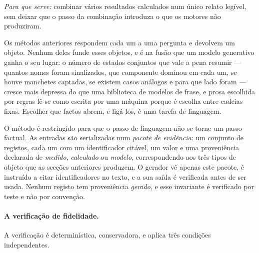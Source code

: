 \emph{Para que serve:} combinar vários resultados calculados num único relato legível, sem deixar que
o passo da combinação introduza o que os motores não produziram.

Os métodos anteriores respondem cada um a uma pergunta e devolvem um objeto. Nenhum deles funde esses
objetos, e é na fusão que um modelo generativo ganha o seu lugar: o número de estados conjuntos que
vale a pena resumir --- quantos nomes foram sinalizados, que componente dominou em cada um, se houve
manchetes captadas, se existem casos análogos e para que lado foram --- cresce mais depressa do que
uma biblioteca de modelos de frase, e prosa escolhida por regras lê-se como escrita por uma máquina
porque é escolha entre cadeias fixas. Escolher que factos abrem, e ligá-los, é uma tarefa de
linguagem.

O método é restringido para que o passo de linguagem não se torne um passo factual. As entradas são
serializadas num \emph{pacote de evidência}: um conjunto de registos, cada um com um identificador
citável, um valor e uma proveniência declarada de \emph{medido}, \emph{calculado} ou \emph{modelo},
correspondendo aos três tipos de objeto que as secções anteriores produzem. O gerador vê apenas este
pacote, é instruído a citar identificadores no texto, e a sua saída é verificada antes de ser usada.
Nenhum registo tem proveniência \emph{gerado}, e esse invariante é verificado por teste e não por
convenção.

\paragraph{A verificação de fidelidade.} A verificação é determinística, conservadora, e aplica três
condições independentes.

